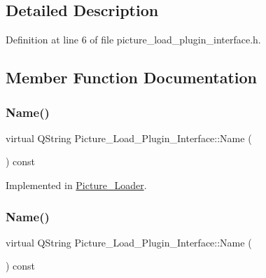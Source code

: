 \subsection{Detailed Description}


Definition at line 6 of file picture\+\_\+load\+\_\+plugin\+\_\+interface.\+h.



\subsection{Member Function Documentation}
\mbox{\label{classPicture__Load__Plugin__Interface_a7cb4c7354f06bc7408ce1072e46db030}} 
\subsubsection{\texorpdfstring{Name()}{Name()}\hspace{0.1cm}{\footnotesize\ttfamily [1/2]}}
{\footnotesize\ttfamily virtual Q\+String Picture\+\_\+\+Load\+\_\+\+Plugin\+\_\+\+Interface\+::\+Name (\begin{DoxyParamCaption}{ }\end{DoxyParamCaption}) const\hspace{0.3cm}{\ttfamily [pure virtual]}}



Implemented in \hyperlink{classPicture__Loader_a043165c946b7bf29dea761463b8cb5fa}{Picture\+\_\+\+Loader}.

\mbox{\label{classPicture__Load__Plugin__Interface_a7cb4c7354f06bc7408ce1072e46db030}} 
\subsubsection{\texorpdfstring{Name()}{Name()}\hspace{0.1cm}{\footnotesize\ttfamily [2/2]}}
{\footnotesize\ttfamily virtual Q\+String Picture\+\_\+\+Load\+\_\+\+Plugin\+\_\+\+Interface\+::\+Name (\begin{DoxyParamCaption}{ }\end{DoxyParamCaption}) const\hspace{0.3cm}{\ttfamily [pure virtual]}}



